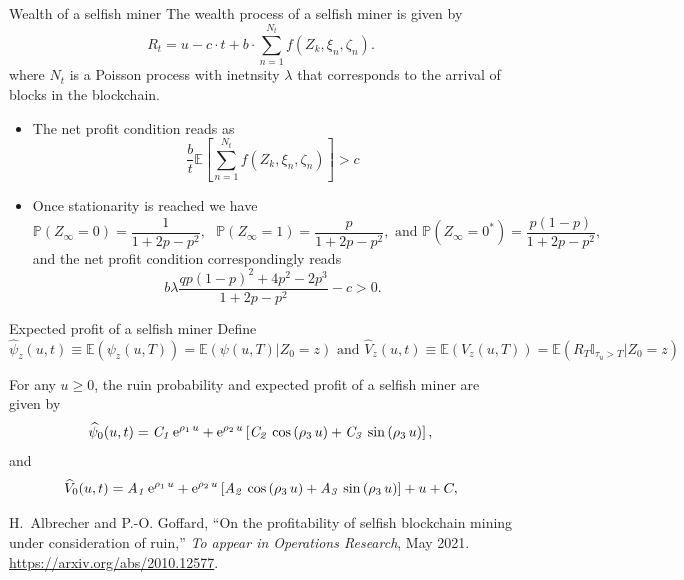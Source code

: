 \documentclass{beamer}
\def \E{\mathbb E}
\def \w{\widehat}
\def \P {\mathbb P}
\begin{document}
\begin{frame}{Wealth of a selfish miner}
\scriptsize
The wealth process of a selfish miner is given by 
$$
R_t = u - c\cdot t +b\cdot\sum_{n=1}^{N_t} f(Z_k,\xi_n,\zeta_n ).
$$
where $N_t$ is a Poisson process with inetnsity $\lambda$ that corresponds to the arrival of blocks in the blockchain.
\begin{itemize}
  \item The net profit condition reads as 
  $$
  \frac{b}{t}\mathbb{E}\left[\sum_{n=1}^{N_t} f(Z_k,\xi_n,\zeta_n )\right] > c
  $$
  \item Once stationarity is reached we have 
  $$
\P(Z_\infty = 0)=\frac{1}{1+2p-p^2},\text{ }\P(Z_\infty = 1)=\frac{p}{1+2p-p^2},\text{ and }\P(Z_\infty = 0^{\ast})=\frac{p(1-p)}{1+2p-p^2},
$$
and the net profit condition correspondingly reads
\begin{equation*}
b\lambda\frac{qp(1-p)^2 + 4p^2-2p^3}{1+2p-p^2} - c>0.
\end{equation*}
\end{itemize}
\end{frame}
\begin{frame}{Expected profit of a selfish miner}
\scriptsize
Define 
\begin{equation*}
\w{\psi}_z(u,t)\equiv \E(\psi_z(u,T)) = \mathbb{E}\left(\psi(u,T)\Big \rvert Z_0 = z\right) \text{ and }\w{V}_z(u,t)\equiv \E(V_z(u,T)) = \mathbb{E}\left(R_T\mathbb{I}_{\tau_u>T}\Big \rvert Z_0 = z\right)
\end{equation*}
\begin{tcolorbox}[enhanced,drop shadow, title=Theorem]
For any $u\ge 0$, the ruin probability and expected profit of a selfish miner are given by
\begin{equation*}\label{ruin_selfish_app}
\w{\psi}_0(u,t) =
{\it C_1}\,{{\rm e}^{\rho_1\,u}}+{{\rm e}^{\rho_2\,u}} \left[ {\it C_2}\,
\cos \left( \rho_3\,u \right) +{\it C_3}\,\sin \left( \rho_3\,u \right)\right],
\end{equation*}
and 
\begin{equation*}
\w{V}_0(u,t)={\it A_1}\,{{\rm e}^{\rho_1\,u}}+{{\rm e}^{\rho_2\,u}} \left[ {\it A_2}\,
\cos \left( \rho_3\,u \right) +{\it A_3}\,\sin \left( \rho_3\,u \right)\right] +u+C,\label{thisone}
\end{equation*}
\end{tcolorbox}
\tiny
  \begin{thebibliography}{1}

H.~Albrecher and P.-O. Goffard, ``{On the profitability of selfish blockchain
  mining under consideration of ruin},'' {\em To appear in Operations
  Research}, May 2021.
\newblock \url{https://arxiv.org/abs/2010.12577}.
\end{thebibliography}
\end{frame}
\end{document}
